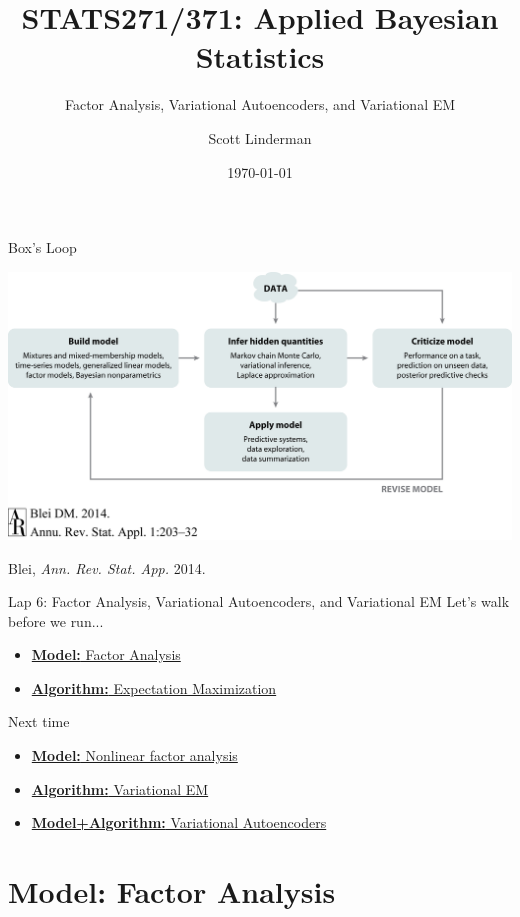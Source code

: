 \documentclass[aspectratio=169]{beamer}
\title{STATS271/371: Applied Bayesian Statistics}
\subtitle{Factor Analysis, Variational Autoencoders, and Variational EM}
\author{Scott Linderman}
\date{\today}
\begin{document}
\maketitle

\begin{frame}{Box's Loop}
\begin{center}
\includegraphics[width=.85\linewidth]{figures/lap1/boxsloop.jpeg}\\
\end{center} 
\begin{flushright}
{\footnotesize Blei, \textit{Ann. Rev. Stat. App.} 2014.}
\end{flushright}
\end{frame}

\begin{frame}{Lap 6: Factor Analysis, Variational Autoencoders, and Variational EM}
Let's walk before we run...
\begin{itemize}
    \item \hyperref[sec:fa]{\textbf{Model:} Factor Analysis}
    \item \hyperref[sec:em]{\textbf{Algorithm:} Expectation Maximization}
\end{itemize}
Next time
\begin{itemize}
    \item \hyperref[sec:vaes]{\textbf{Model:} Nonlinear factor analysis}
    \item \hyperref[sec:vem]{\textbf{Algorithm:} Variational EM}
    \item \hyperref[sec:vaes]{\textbf{Model+Algorithm:} Variational Autoencoders}
\end{itemize}
\end{frame}

\section{Model: Factor Analysis}
\label{sec:fa}
\end{document}
